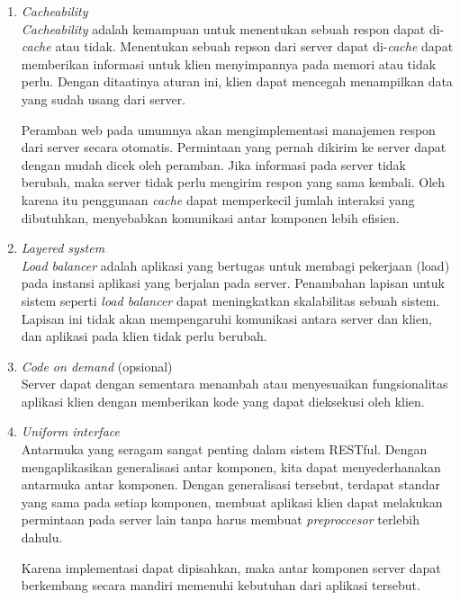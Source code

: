 \begin{enumerate}
        \item \textit{Cacheability}\\
            \textit{Cacheability} adalah kemampuan untuk menentukan sebuah
            respon dapat di-\textit{cache} atau tidak. Menentukan sebuah repson
            dari server dapat di-\textit{cache} dapat memberikan informasi untuk
            klien menyimpannya pada memori atau tidak perlu. Dengan ditaatinya
            aturan ini, klien dapat mencegah menampilkan data yang sudah usang
            dari server.
            
            Peramban web pada umumnya akan mengimplementasi manajemen respon
            dari server secara otomatis. Permintaan yang pernah dikirim ke
            server dapat dengan mudah dicek oleh peramban. Jika informasi pada
            server tidak berubah, maka server tidak perlu mengirim respon yang
            sama kembali. Oleh karena itu penggunaan \textit{cache} dapat
            memperkecil jumlah interaksi yang dibutuhkan, menyebabkan komunikasi
            antar komponen lebih efisien.
            
        \item \textit{Layered system}\\
            \textit{Load balancer} adalah aplikasi yang bertugas untuk membagi
            pekerjaan (load) pada instansi aplikasi yang berjalan pada server.
            Penambahan lapisan untuk sistem seperti \textit{load balancer} dapat
            meningkatkan skalabilitas sebuah sistem. Lapisan ini tidak akan
            mempengaruhi komunikasi antara server dan klien, dan aplikasi pada
            klien tidak perlu berubah.
        
        \item \textit{Code on demand} (opsional)\\
            Server dapat dengan sementara menambah atau menyesuaikan
            fungsionalitas aplikasi klien dengan memberikan kode yang dapat
            dieksekusi oleh klien.
        
        \item \textit{Uniform interface}\\
            Antarmuka yang seragam sangat penting dalam sistem RESTful. Dengan
            mengaplikasikan generalisasi antar komponen, kita dapat
            menyederhanakan antarmuka antar komponen. Dengan generalisasi
            tersebut, terdapat standar yang sama pada setiap komponen, membuat
            aplikasi klien dapat melakukan permintaan pada server lain tanpa
            harus membuat \textit{preproccesor} terlebih dahulu.
            
            Karena implementasi dapat dipisahkan, maka antar komponen server
            dapat berkembang secara mandiri memenuhi kebutuhan dari aplikasi
            tersebut.
            
    \end{enumerate}

